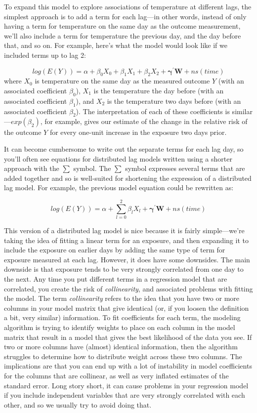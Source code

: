 \documentclass[
]{book}
\begin{document}
To expand this model to explore associations of temperature at different lags, the
simplest approach is to add a term for each lag---in other words, instead of only having
a term for temperature on the same day as the outcome measurement, we'll also include a
term for temperature the previous day, and the day before that, and so on. For example,
here's what the model would look like if we included terms up to lag 2:

\[
log(E(Y)) = \alpha + \beta_{0} X_{0} + \beta_{1} X_{1} + \beta_{2} X_{2} + \mathbf{\gamma^{'}W} + ns(time)
\]
where \(X_0\) is temperature on the same day as the measured outcome \(Y\) (with an
associated coefficient \(\beta_0\)), \(X_1\) is the temperature the day before (with an
associated coefficient \(\beta_1\)), and \(X_2\) is the temperature two days before (with an
associated coefficient \(\beta_2\)). The interpretation of each of these coefficients
is similar---\(exp(\beta_2)\), for example, gives our estimate of the change in the relative
risk of the outcome \(Y\) for every one-unit increase in the exposure two days prior.

It can become cumbersome to write out the separate terms for each lag day, so you'll often
see equations for distributed lag models written using a shorter approach with the
\(\sum\) symbol. The \(\sum\) symbol expresses several terms that are added together and so
is well-suited for shortening the expression of a distributed lag model. For example, the
previous model equation could be rewritten as:

\[
log(E(Y)) = \alpha + \sum_{l=0}^2{\beta_lX_l} + \mathbf{\gamma^{'}W} + ns(time)
\]

This version of a distributed lag model is nice because it is fairly simple---we're taking the
idea of fitting a linear term for an exposure, and then expanding it to include the
exposure on earlier days by adding the same type of term for exposure measured at each lag.
However, it does have some downsides. The main downside is that exposure
tends to be very strongly correlated from one day to the next. Any time you put different terms in a regression model that are correlated, you create the risk of \emph{collinearity}, and associated
problems with fitting the model. The term \emph{collinearity} refers to the idea that you have two or more
columns in your model matrix that give identical (or, if you loosen the definition a bit,
very similar) information. To fit coefficients for each term, the modeling algorithm is trying
to identify weights to place on each column in the model matrix that result in a model that
gives the best likelihood of the data you see. If two or more columns have (almost) identical
information, then the algorithm struggles to determine how to distribute weight across these
two columns. The implications are that you can end up with a lot of instability in model
coefficients for the columns that are collinear, as well as very inflated estimates of the
standard error. Long story short, it can cause problems in your regression model if you include
independent variables that are very strongly correlated with each other, and so we usually
try to avoid doing that.
\end{document}
